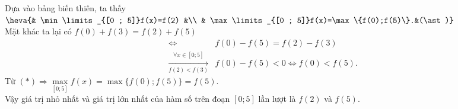\begin{ex}
{\begin{center}
        \end{center}
        Dựa vào bảng biến thiên, ta thấy $ \heva{& \min\limits_{[0 ; 5]}f(x)=f(2) &\\ & \max\limits_{[0 ; 5]}f(x)=\max\{f(0);f(5)\}.&(\ast)} $\\
        Mặt khác ta lại có $ f(0)+f(3)=f(2)+f(5) $
        \begin{eqnarray*}
            &\Leftrightarrow&f(0)-f(5)=f(2)-f(3)\\
            &\xrightarrow[f(2)<f(3)]{\forall x \in [0;5]}&f(0)-f(5)<0 \Leftrightarrow f(0)<f(5).
        \end{eqnarray*}
        Từ $ (\ast) \Rightarrow \max\limits_{[0 ; 5]}f(x)=\max\{f(0);f(5)\}=f(5)$.\\
        Vậy giá trị nhỏ nhất và giá trị lớn nhất của hàm số trên đoạn $ [0;5] $ lần lượt là $f(2)$ và $ f(5) $.
    }
\end{ex}

